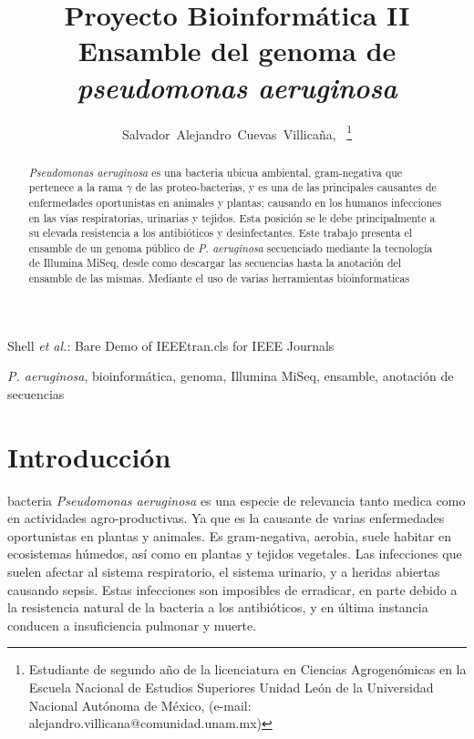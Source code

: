 \documentclass[journal, letterpaper, 11pt]{IEEEtran}
\begin{document}
\title{Proyecto Bioinformática II\\Ensamble del genoma de \textit{pseudomonas aeruginosa}}
\author{Salvador~Alejandro~Cuevas~Villicaña,~
\thanks{Estudiante de segundo año de la licenciatura en Ciencias Agrogenómicas en la Escuela Nacional de Estudios Superiores Unidad León de la Universidad Nacional Autónoma de México, (e-mail: alejandro.villicana@comunidad.unam.mx)} 
}

{Shell \MakeLowercase{\textit{et al.}}: Bare Demo of IEEEtran.cls for IEEE Journals}

\maketitle

\begin{abstract}
\textit{Pseudomonas aeruginosa} es una bacteria ubicua ambiental, gram-negativa que pertenece a la rama $\gamma$ de las proteo-bacterias, y es una de las principales causantes de enfermedades oportunistas en animales y plantas; causando en los humanos infecciones en las vías respiratorias, urinarias y tejidos. Esta posición se le debe principalmente a su elevada resistencia a los antibióticos y desinfectantes. Este trabajo presenta el ensamble de un genoma público de \textit{P. aeruginosa} secuenciado mediante la tecnología de Illumina MiSeq, desde como descargar las secuencias hasta la anotación del ensamble de las mismas. Mediante el uso de varias herramientas bioinformaticas
\end{abstract}


\begin{IEEEkeywords}
\textit{P. aeruginosa}, bioinformática, genoma, Illumina MiSeq, ensamble, anotación de secuencias
\end{IEEEkeywords}

\IEEEpeerreviewmaketitle



\section{Introducción}

 bacteria \textit{Pseudomonas aeruginosa} es una especie de relevancia tanto medica como en actividades agro-productivas. Ya que es la causante de varias enfermedades oportunistas en plantas y animales. Es gram-negativa, aerobia, suele habitar en ecosistemas húmedos, así como en plantas y tejidos vegetales. Las infecciones que suelen afectar al sistema respiratorio, el sistema urinario, y a heridas abiertas causando sepsis. Estas infecciones son imposibles de erradicar, en parte debido a la resistencia natural de la bacteria a los antibióticos, y en última instancia conducen a insuficiencia pulmonar y muerte.
\end{document}

